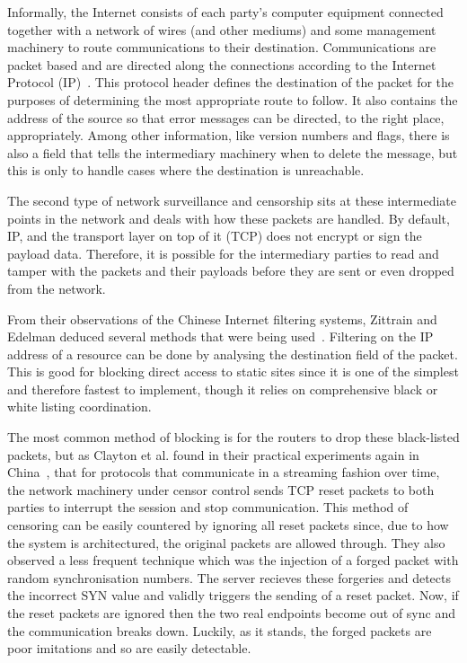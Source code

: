 \documentclass[ %
                    author={Samuel Russell},
                supervisor={Prof. Bogdan Warinschi},
                    degree={MEng},
                     title={Innocuous Ciphertexts},
                  subtitle={The DE-CENSOR Scheme},
                      type={Research},
                      year={2018} ]{dissertation}
\begin{document}
Informally, the Internet consists of each party's computer equipment connected together with a network of wires (and other mediums) and some management machinery to route communications to their destination.
Communications are packet based and are directed along the connections according to the Internet Protocol (IP)~\cite{ip4}.
This protocol header defines the destination of the packet for the purposes of determining the most appropriate route to follow.
It also contains the address of the source so that error messages can be directed, to the right place, appropriately.
Among other information, like version numbers and flags, there is also a field that tells the intermediary machinery when to delete the message, but this is only to handle cases where the destination is unreachable.

The second type of network surveillance and censorship sits at these intermediate points in the network and deals with how these packets are handled. By default, IP, and the transport layer on top of it (TCP) does not encrypt or sign the payload data. Therefore, it is possible for the intermediary parties to read and tamper with the packets and their payloads before they are sent or even dropped from the network.

From their observations of the Chinese Internet filtering systems, Zittrain and Edelman deduced several methods that were being used~\cite{edelman2005empirical}.
Filtering on the IP address of a resource can be done by analysing the destination field of the packet. This is good for blocking direct access to static sites since it is one of the simplest and therefore fastest to implement, though it relies on comprehensive black or white listing coordination.

The most common method of blocking is for the routers to drop these black-listed packets, but as Clayton et al. found in their practical experiments again in China~\cite{clayton2006ignoring}, that for protocols that communicate in a streaming fashion over time, the network machinery under censor control sends TCP reset packets to both parties to interrupt the session and stop communication. This method of censoring can be easily countered by ignoring all reset packets since, due to how the system is architectured, the original packets are allowed through. They also observed a less frequent technique which was the injection of a forged packet with random synchronisation numbers. The server recieves these forgeries and detects the incorrect SYN value and validly triggers the sending of a reset packet. Now, if the reset packets are ignored then the two real endpoints become out of sync and the communication breaks down. Luckily, as it stands, the forged packets are poor imitations and so are easily detectable.
\end{document}
